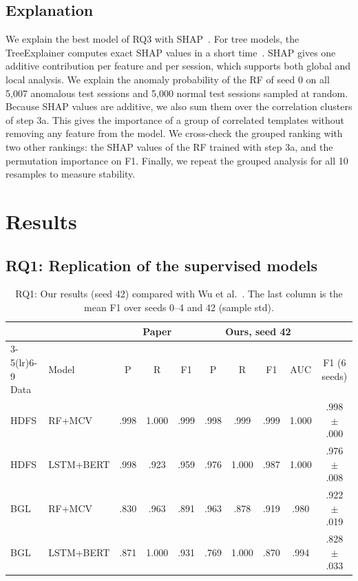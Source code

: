 \documentclass[10pt, conference]{IEEEtran}
\begin{document}
\subsection{Explanation}

We explain the best model of RQ3 with SHAP~\cite{lundberg2017unified}. For tree models, the TreeExplainer computes exact SHAP values in a short time~\cite{lundberg2020local}. SHAP gives one additive contribution per feature and per session, which supports both global and local analysis. We explain the anomaly probability of the RF of seed 0 on all 5,007 anomalous test sessions and 5,000 normal test sessions sampled at random. Because SHAP values are additive, we also sum them over the correlation clusters of step 3a. This gives the importance of a group of correlated templates without removing any feature from the model. We cross-check the grouped ranking with two other rankings: the SHAP values of the RF trained with step 3a, and the permutation importance on F1. Finally, we repeat the grouped analysis for all 10 resamples to measure stability.

\section{Results}
\label{sec:results}

\subsection{RQ1: Replication of the supervised models}
\label{sec:rq1}

\begin{table}[t]
\centering
\caption{RQ1: Our results (seed 42) compared with Wu et al.~\cite{wu2023effectiveness}. The last column is the mean F1 over seeds 0--4 and 42 (sample std).}
\label{tab:rq1}
\footnotesize
\setlength{\tabcolsep}{1.7pt}
\begin{tabular}{llcccccccc}
\toprule
 & & \multicolumn{3}{c}{Paper} & \multicolumn{4}{c}{Ours, seed 42} & \\
\cmidrule(lr){3-5}\cmidrule(lr){6-9}
Data & Model & P & R & F1 & P & R & F1 & AUC & F1 (6 seeds) \\
\midrule
HDFS & RF+MCV & .998 & 1.000 & .999 & .998 & .999 & .999 & 1.000 & .998 $\pm$ .000 \\
HDFS & LSTM+BERT & .998 & .923 & .959 & .976 & 1.000 & .987 & 1.000 & .976 $\pm$ .008 \\
BGL & RF+MCV & .830 & .963 & .891 & .963 & .878 & .919 & .980 & .922 $\pm$ .019 \\
BGL & LSTM+BERT & .871 & 1.000 & .931 & .769 & 1.000 & .870 & .994 & .828 $\pm$ .033 \\
\bottomrule
\end{tabular}
\end{table}
\end{document}
